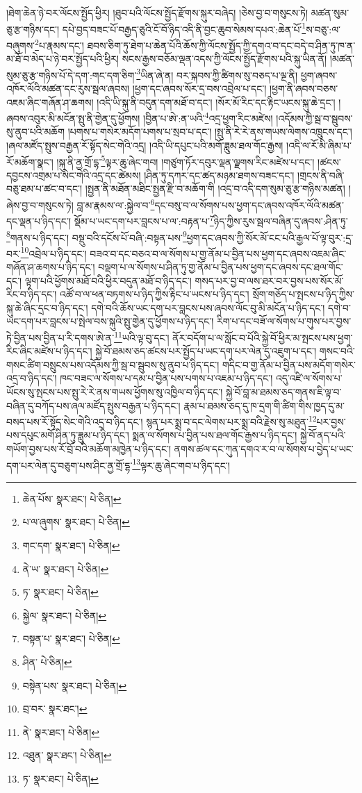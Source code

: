 །ཐེག་ཆེན་ཉེ་བར་ལོངས་སྤྱོད་ཕྱིར། །ཐུབ་པའི་ལོངས་སྤྱོད་རྫོགས་སྐུར་བཞེད། །ཅེས་བྱ་བ་གསུངས་ཏེ། མཚན་སུམ་ཅུ་རྩ་གཉིས་དང་། དཔེ་བྱད་བཟང་པོ་བརྒྱད་ཅུའི་ངོ་བོ་ཉིད་འདི་ནི་བྱང་ཆུབ་སེམས་དཔའ་:ཆེན་པོ་\footnote{ཆེན་པོས་  སྣར་ཐང་།  པེ་ཅིན། }ས་བཅུ་:ལ་བཞུགས་\footnote{པ་ལ་ཞུགས་  སྣར་ཐང་།  པེ་ཅིན། }པ་རྣམས་དང་། ཐབས་ཅིག་ཏུ་ཐེག་པ་ཆེན་པོའི་ཆོས་ཀྱི་ལོངས་སྤྱོད་ཀྱི་དགའ་བ་དང་བདེ་བ་ཤིན་ཏུ་ཁ་ན་མ་ཐོ་བ་མེད་པ་ཉེ་བར་སྤྱོད་པའི་ཕྱིར། སངས་རྒྱས་བཅོམ་ལྡན་འདས་ཀྱི་ལོངས་སྤྱོད་རྫོགས་པའི་སྐུ་ཡིན་ནོ། །མཚན་སུམ་ཅུ་རྩ་གཉིས་པོ་དེ་དག་:གང་དག་ཅིག་\footnote{གང་དག་  སྣར་ཐང་།  པེ་ཅིན། }ཡིན་ཞེ་ན། བར་སྐབས་ཀྱི་ཚིགས་སུ་བཅད་པ་ལྔ་ནི། ཕྱག་ཞབས་འཁོར་ལོའི་མཚན་དང་རུས་སྦལ་ཞབས། །ཕྱག་དང་ཞབས་སོར་དྲ་བས་འབྲེལ་པ་དང་། །ཕྱག་ནི་ཞབས་བཅས་འཇམ་ཞིང་གཞོན་ཤ་ཆགས། །འདི་ཡི་སྐུ་ནི་བདུན་དག་མཐོ་བ་དང་། །སོར་མོ་རིང་དང་རྟིང་ཡངས་སྐུ་ཆེ་དྲང་། །ཞབས་འབུར་མི་མངོན་སྤུ་ནི་གྱེན་དུ་ཕྱོགས། །བྱིན་པ་ཨེ་:ན་ཡའི་\footnote{ནེ་ཡ་  སྣར་ཐང་།  པེ་ཅིན། }འདྲ་ཕྱག་རིང་མཛེས། །འདོམས་ཀྱི་སྦ་བ་སྦུབས་སུ་ནུབ་པའི་མཆོག །པགས་པ་གསེར་མདོག་པགས་པ་སྲབ་པ་དང་། །སྤུ་ནི་རེ་རེ་ནས་གཡས་ལེགས་འཁྲུངས་དང་། །ཞལ་མཛོད་སྤུས་བརྒྱན་རོ་སྟོད་སེང་གེའི་འདྲ། །འདི་ཡི་དཔུང་པའི་མགོ་ཟླུམ་ཐལ་གོང་རྒྱས། །འདི་ལ་རོ་མི་ཞིམ་པ་རོ་མཆོག་སྣང་། །སྐུ་ནི་ནྱ་གྲོ་དྷ་\footnote{ཏ་  སྣར་ཐང་།  པེ་ཅིན། }ལྟར་ཆུ་ཞེང་གབ། །གཙུག་ཏོར་དབུར་ལྡན་ལྗགས་རིང་མཛེས་པ་དང་། །ཚངས་དབྱངས་འགྲམ་པ་སེང་གེའི་འདྲ་དང་ཚེམས། །ཤིན་ཏུ་དཀར་དང་ཚད་མཉམ་ཐགས་བཟང་དང་། །གྲངས་ནི་བཞི་བཅུ་ཐམ་པ་ཚང་བ་དང་། །སྤྱན་ནི་མཐོན་མཐིང་སྤྱན་རྫི་བ་མཆོག་གི །འདྲ་བ་འདི་དག་སུམ་ཅུ་རྩ་གཉིས་མཚན། །ཞེས་བྱ་བ་གསུངས་ཏེ། བླ་མ་རྣམས་ལ་:སྐྱེལ་བ་\footnote{སྐྱེལ་  སྣར་ཐང་།  པེ་ཅིན། }དང་བསུ་བ་ལ་སོགས་པས་ཕྱག་དང་ཞབས་འཁོར་ལོའི་མཚན་དང་ལྡན་པ་ཉིད་དང་། སྡོམ་པ་ཡང་དག་པར་བླངས་པ་ལ་:བརྟན་པ་\footnote{བསྟན་པ་  སྣར་ཐང་།  པེ་ཅིན། }ཉིད་ཀྱིས་རུས་སྦལ་བཞིན་དུ་ཞབས་:ཤིན་ཏུ་\footnote{ཤིན་  པེ་ཅིན། }གནས་པ་ཉིད་དང་། བསྡུ་བའི་དངོས་པོ་བཞི་:བསྟན་པས་\footnote{བསྟེན་པས་  སྣར་ཐང་།  པེ་ཅིན། }ཕྱག་དང་ཞབས་ཀྱི་སོར་མོ་ངང་པའི་རྒྱལ་པོ་ལྟ་བུར་:དྲ་བར་\footnote{བྲ་བར་  སྣར་ཐང་། }འབྲེལ་པ་ཉིད་དང་། བཟའ་བ་དང་བཅའ་བ་ལ་སོགས་པ་གྱ་ནོམ་པ་བྱིན་པས་ཕྱག་དང་ཞབས་འཇམ་ཞིང་གཞོན་ཤ་ཆགས་པ་ཉིད་དང་། བལྡག་པ་ལ་སོགས་པ་ཤིན་ཏུ་གྱ་ནོམ་པ་བྱིན་པས་ཕྱག་དང་ཞབས་དང་ཐལ་གོང་དང་། ལྟག་པའི་ཕྱོགས་མཐོ་བའི་ཕྱིར་བདུན་མཐོ་བ་ཉིད་དང་། གསད་པར་བྱ་བ་ལས་ཐར་བར་བྱས་པས་སོར་མོ་རིང་བ་ཉིད་དང་། འཚོ་བ་ལ་ཕན་བཏགས་པ་ཉིད་ཀྱིས་རྟིང་པ་ཡངས་པ་ཉིད་དང་། སྲོག་གཅོད་པ་སྤངས་པ་ཉིད་ཀྱིས་སྐུ་ཆེ་ཞིང་དྲང་བ་ཉིད་དང་། དགེ་བའི་ཆོས་ཡང་དག་པར་བླངས་པས་ཞབས་ལོང་བུ་མི་མངོན་པ་ཉིད་དང་། དགེ་བ་ཡང་དག་པར་བླངས་པ་སྤེལ་བས་སྐུའི་སྤུ་གྱེན་དུ་ཕྱོགས་པ་ཉིད་དང་། རིག་པ་དང་བཟོ་ལ་སོགས་པ་གུས་པར་བྱས་ཏེ་བྱིན་པས་བྱིན་པ་རི་དགས་ཨེ་ན་\footnote{ནེ་  སྣར་ཐང་།  པེ་ཅིན། }ཡའི་ལྟ་བུ་དང་། ནོར་བདོག་པ་ལ་སློང་བ་པོའི་སྐྱེ་བོ་ཕྱིར་མ་སྤངས་པས་ཕྱག་རིང་ཞིང་མཛེས་པ་ཉིད་དང་། སྐྱེ་བོ་ཐམས་ཅད་ཚངས་པར་སྤྱོད་པ་ཡང་དག་པར་ལེན་དུ་འཇུག་པ་དང་། གསང་བའི་གསང་ཚིག་བསྲུངས་པས་འདོམས་ཀྱི་སྦ་བ་སྦུབས་སུ་ནུབ་པ་ཉིད་དང་། གདིང་བ་གྱ་ནོམ་པ་བྱིན་པས་མདོག་གསེར་འདྲ་བ་ཉིད་དང་། ཁང་བཟང་ལ་སོགས་པ་དམ་པ་བྱིན་པས་པགས་པ་འཇམ་པ་ཉིད་དང་། འདུ་འཛི་ལ་སོགས་པ་ཡོངས་སུ་སྤངས་པས་སྤུ་རེ་རེ་ནས་གཡས་ཕྱོགས་སུ་འཁྱིལ་བ་ཉིད་དང་། སྐྱེ་བོ་བླ་མ་ཐམས་ཅད་གནས་ཇི་ལྟ་བ་བཞིན་དུ་བཀོད་པས་ཞལ་མཛོད་སྤུས་བརྒྱན་པ་ཉིད་དང་། རྣམ་པ་ཐམས་ཅད་དུ་ཁ་དྲག་གི་ཚིག་གིས་ཁྱད་དུ་མ་བསད་པས་རོ་སྟོད་སེང་གེའི་འདྲ་བ་ཉིད་དང་། སྙན་པར་སྨྲ་བ་དང་ལེགས་པར་སྨྲ་བའི་རྗེས་སུ་མཐུན་\footnote{འཐུན་  སྣར་ཐང་།  པེ་ཅིན། }པར་བྱས་པས་དཔུང་མགོ་ཤིན་ཏུ་ཟླུམ་པ་ཉིད་དང་། སྨན་ལ་སོགས་པ་བྱིན་པས་ཐལ་གོང་རྒྱས་པ་ཉིད་དང་། སྐྱེ་བོ་ནད་པའི་གཡོག་བྱས་པས་རོ་བྲོ་བའི་མཆོག་མཁྱེན་པ་ཉིད་དང་། ནགས་ཚལ་དང་ཀུན་དགའ་ར་བ་ལ་སོགས་པ་བྱེད་པ་ཡང་དག་པར་ལེན་དུ་བཅུག་པས་ཤིང་ནྱ་གྲོ་དྷ་\footnote{ཏ་  སྣར་ཐང་།  པེ་ཅིན། }ལྟར་ཆུ་ཞེང་གབ་པ་ཉིད་དང་། 